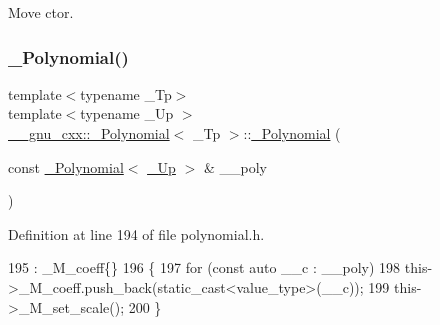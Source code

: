 Move ctor. \mbox{\label{class____gnu__cxx_1_1__Polynomial_ae744374b972b91a9609ba6cc1330bbfd}} 
\subsubsection{\texorpdfstring{\+\_\+\+Polynomial()}{\_Polynomial()}\hspace{0.1cm}{\footnotesize\ttfamily [4/9]}}
{\footnotesize\ttfamily template$<$typename \+\_\+\+Tp$>$ \\
template$<$typename \+\_\+\+Up $>$ \\
\hyperlink{class____gnu__cxx_1_1__Polynomial}{\+\_\+\+\_\+gnu\+\_\+cxx\+::\+\_\+\+Polynomial}$<$ \+\_\+\+Tp $>$\+::\hyperlink{class____gnu__cxx_1_1__Polynomial}{\+\_\+\+Polynomial} (\begin{DoxyParamCaption}\item[{const \hyperlink{class____gnu__cxx_1_1__Polynomial}{\+\_\+\+Polynomial}$<$ \hyperlink{class____gnu__cxx_1_1__Polynomial_a242114d4b86648a5dff67a8221f80d40}{\+\_\+\+Up} $>$ \&}]{\+\_\+\+\_\+poly }\end{DoxyParamCaption})\hspace{0.3cm}{\ttfamily [inline]}}



Definition at line 194 of file polynomial.\+h.


\begin{DoxyCode}
195         : \_M\_coeff\{\}
196         \{
197           \textcolor{keywordflow}{for} (\textcolor{keyword}{const} \textcolor{keyword}{auto} \_\_c : \_\_poly)
198             this->\_M\_coeff.push\_back(static\_cast<value\_type>(\_\_c));
199           this->\_M\_set\_scale();
200         \}
\end{DoxyCode}
\mbox{\label{class____gnu__cxx_1_1__Polynomial_ad89b416fedd4e3a23b484d5269767a93}} 
